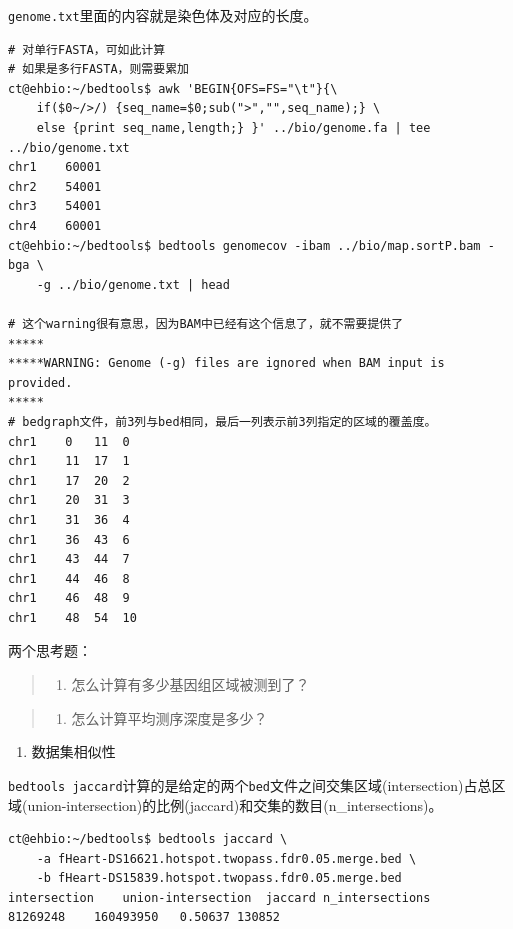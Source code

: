 \documentclass[]{article}
\providecommand{\tightlist}{%
  \setlength{\itemsep}{0pt}\setlength{\parskip}{0pt}}
\numberwithin{figure}{section}
\numberwithin{table}{section}
\begin{document}
\texttt{genome.txt}里面的内容就是染色体及对应的长度。

\begin{verbatim}
# 对单行FASTA，可如此计算
# 如果是多行FASTA，则需要累加
ct@ehbio:~/bedtools$ awk 'BEGIN{OFS=FS="\t"}{\
	if($0~/>/) {seq_name=$0;sub(">","",seq_name);} \
	else {print seq_name,length;} }' ../bio/genome.fa | tee ../bio/genome.txt 
chr1	60001
chr2	54001
chr3	54001
chr4	60001
ct@ehbio:~/bedtools$ bedtools genomecov -ibam ../bio/map.sortP.bam -bga \
	-g ../bio/genome.txt | head

# 这个warning很有意思，因为BAM中已经有这个信息了，就不需要提供了
*****
*****WARNING: Genome (-g) files are ignored when BAM input is provided. 
*****
# bedgraph文件，前3列与bed相同，最后一列表示前3列指定的区域的覆盖度。
chr1	0	11	0
chr1	11	17	1
chr1	17	20	2
chr1	20	31	3
chr1	31	36	4
chr1	36	43	6
chr1	43	44	7
chr1	44	46	8
chr1	46	48	9
chr1	48	54	10
\end{verbatim}

两个思考题：

\begin{quote}
\begin{enumerate}
\def\labelenumi{\arabic{enumi}.}
\tightlist
\item
  怎么计算有多少基因组区域被测到了？
\end{enumerate}
\end{quote}

\begin{quote}
\begin{enumerate}
\def\labelenumi{\arabic{enumi}.}
\setcounter{enumi}{1}
\tightlist
\item
  怎么计算平均测序深度是多少？
\end{enumerate}
\end{quote}

\begin{enumerate}
\def\labelenumi{\arabic{enumi}.}
\setcounter{enumi}{6}
\tightlist
\item
  数据集相似性
\end{enumerate}

\texttt{bedtools\ jaccard}计算的是给定的两个\texttt{bed}文件之间交集区域(intersection)占总区域(union-intersection)的比例(jaccard)和交集的数目(n\_intersections)。

\begin{verbatim}
ct@ehbio:~/bedtools$ bedtools jaccard \
	-a fHeart-DS16621.hotspot.twopass.fdr0.05.merge.bed \
	-b fHeart-DS15839.hotspot.twopass.fdr0.05.merge.bed
intersection	union-intersection	jaccard	n_intersections
81269248	160493950	0.50637	130852
\end{verbatim}
\end{document}
